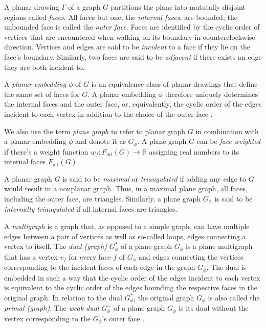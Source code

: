 A planar drawing $\Gamma$ of a graph $G$ partitions the plane into mututally disjoint regions called \emph{faces}.
All faces but one, the \emph{internal faces}, are bounded; the unbounded face is called the \emph{outer face}.
Faces are identified by the cyclic order of vertices that are encountered when walking on its boundary \cite{angelini2015monotone} in counterclockwise direction.
Vertices and edges are said to be \emph{incident} to a face if they lie on the face's boundary.
Similarly, two faces are said to be \emph{adjacent} if there exists an edge they are both incident to.


A \emph{planar embedding} $\phi$ of $G$ is an equivalence class of planar drawings that define the same set of faces for $G$.
A planar embedding $\phi$ therefore uniquely determines the internal faces and the outer face, or, equivalently, the cyclic order of the edges incident to each vertex in addition to the choice of the outer face \cite{angelini2015monotone}.

We also use the term \emph{plane graph} to refer to planar graph $G$ in combination with a planar embedding $\phi$ and denote it as $G_\phi$. A plane graph $G$ can be \emph{face-weighted} if there's a weight function $w_f \colon F_\text{int}(G) \to \mathbb{R}$ assigning real numbers to its internal faces $F_\text{int}(G)$.


A planar graph $G$ is said to be \emph{maximal} or \emph{triangulated} if adding any edge to $G$ would result in a nonplanar graph.
Thus, in a maximal plane graph, all faces, including the outer face, are triangles.
Similarly, a plane graph $G_\phi$ is said to be \emph{internally triangulated} if all internal faces are triangles.

A \emph{multigraph} is a graph that, as opposed to a simple graph, can have multiple edges between a pair of vertices as well as so-called loops, \ie{} edges connecting a vertex to itself.
The \emph{dual (graph)} $G_\phi^*$ of a plane graph $G_\phi$ is a plane multigraph that has a vertex $v_f$ for every face $f$ of $G_\phi$ and edges connecting the vertices corresponding to the incident faces of each edge in the graph $G_\phi$.
The dual is embedded in such a way that the cyclic order of the edges incident to each vertex is equivalent to the cyclic order of the edges bounding the respective faces in the original graph.
In relation to the dual $G_\phi^*$, the original graph $G_\phi$ is also called the \emph{primal (graph)}.
The \emph{weak dual} $G_\phi^-$ of a plane graph $G_\phi$ is its dual without the vertex corresponding to the $G_\phi$'s outer face \cite{fleischner1974}.

